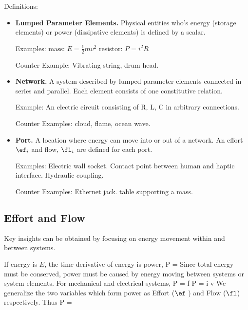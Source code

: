 Definitions:
\begin{itemize}

  \item {\bf Lumped Parameter Elements.}   Physical entities who's energy (storage elements) or power (dissipative elements) is defined by a scalar.

Examples:  mass:  $E = \frac{1}{2}mv^2$   resistor: $P = i^2R$

Counter Example:   Vibrating string, drum head.

  \item {\bf Network.}  A system described by lumped parameter elements connected in series and parallel.  Each element consists of one constitutive relation.

Example:   An electric circuit consisting of R, L, C in arbitrary connections.

Counter Examples:  cloud, flame, ocean wave.

   \item {\bf Port.}     A location where energy can move into or out of a network.  An effort $\ef_i$ and flow, $\fl_i$ are defined for each port.

Examples:  Electric wall socket.   Contact point between human and haptic interface.  Hydraulic coupling.

Counter Examples:  Ethernet jack.   table supporting a mass.

\end{itemize}


\subsection{Effort and Flow}
Key insights can be obtained by focusing on energy movement within and between systems.

If energy is $E$, the time derivative of energy is power,
\bq
P = 
\eq
Since total energy must be conserved, power must be caused by energy moving between systems or system elements.
For  mechanical and electrical systems,
\bq
P = f \times {} \qquad      P = i \times v
\eq
We generalize the two variables which form power as  Effort ($\ef$ ) and Flow ($\fl$) respectively.
Thus
\bq
P = \ef \times \fl
\eq




